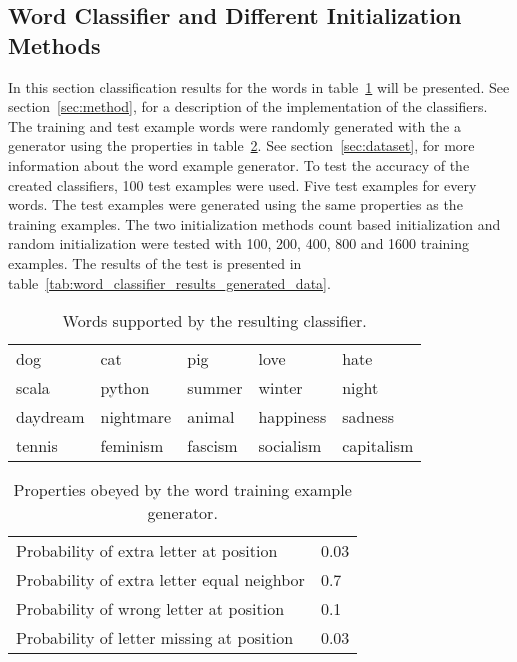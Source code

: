             


\subsection{Word Classifier and Different Initialization Methods}


In this section classification results for the words in table~\ref{tab:words_supported_by_classifier} will be presented. See section~\ref{sec:method}, for a description of the implementation of the classifiers. The training and test example words were randomly generated with the a generator using the properties in table~\ref{tab:word_generator_properties}. See section~\ref{sec:dataset}, for more information about the word example generator. To test the accuracy of the created classifiers, 100 test examples were used. Five test examples for every words. The test examples were generated using the same properties as the training examples. The two initialization methods count based initialization and random initialization were tested with 100, 200, 400, 800 and 1600 training examples. The results of the test is presented in table~\ref{tab:word_classifier_results_generated_data}.

\begin{table}[htb]
  \begin{center}
  \begin{tabular}{ l l l l l }
    dog      & cat       & pig     & love       & hate  \\
    scala    & python    & summer  & winter     & night  \\ 
    daydream & nightmare & animal  & happiness  & sadness \\ 
    tennis   & feminism  & fascism & socialism  & capitalism \\
  \end{tabular}
\end{center}
\caption{Words supported by the resulting classifier.} 
\label{tab:words_supported_by_classifier} 
\end{table}

\begin{table}[htb]
  \begin{center}
  \begin{tabular}{ l l }
    Probability of extra letter at position         & 0.03 \\
    Probability of extra letter equal neighbor      & 0.7 \\ 
    Probability of wrong letter at position         & 0.1 \\ 
    Probability of letter missing at position       & 0.03 \\
  \end{tabular}
\end{center}
\caption{Properties obeyed by the word training example generator.} 
\label{tab:word_generator_properties} 
\end{table}

